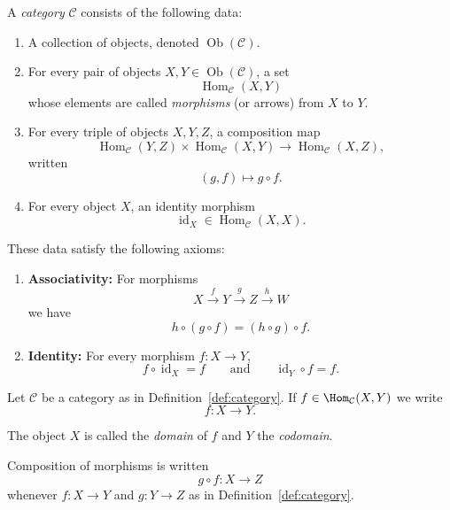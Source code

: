 
\begin{definition}[Category] \label{def:category} 
A \emph{category} $\mathcal{C}$ consists of the following data:
\begin{enumerate} 
  \item A collection of objects, denoted $\operatorname{Ob}(\mathcal{C})$. 
  \item For every pair of objects $X,Y \in \operatorname{Ob}(\mathcal{C})$, a set $$ \operatorname{Hom}_{\mathcal{C}}(X,Y) $$ whose elements are called \emph{morphisms} (or arrows) from $X$ to $Y$. 
  \item For every triple of objects $X,Y,Z$, a composition map $$ \operatorname{Hom}_{\mathcal{C}}(Y,Z) \times \operatorname{Hom}_{\mathcal{C}}(X,Y) \to \operatorname{Hom}_{\mathcal{C}}(X,Z), $$ written $$ (g,f) \mapsto g \circ f . $$ 
  \item For every object $X$, an identity morphism $$ \operatorname{id}_X \in \operatorname{Hom}_{\mathcal{C}}(X,X). $$ 
  \end{enumerate} 
These data satisfy the following axioms: 
\begin{enumerate} 
\item \textbf{Associativity:} For morphisms $$ X \xrightarrow{f} Y \xrightarrow{g} Z \xrightarrow{h} W $$ we have $$ h \circ (g \circ f) = (h \circ g) \circ f . $$ 
\item \textbf{Identity:} For every morphism $f : X \to Y$, $$ f \circ \operatorname{id}_X = f \qquad\text{and}\qquad \operatorname{id}_Y \circ f = f . $$ \end{enumerate}
\end{definition}



\begin{remark}
\label{rmk:morphism-notation}

Let $\mathcal{C}$ be a category as in Definition~\ref{def:category}.  
If $f \in \Hom_{\mathcal{C}}(X,Y)$ we write
$$
f : X \to Y.
$$

The object $X$ is called the \emph{domain} of $f$ and $Y$ the \emph{codomain}.

Composition of morphisms is written
$$
g \circ f : X \to Z
$$
whenever $f : X \to Y$ and $g : Y \to Z$ as in Definition~\ref{def:category}.
\end{remark}


